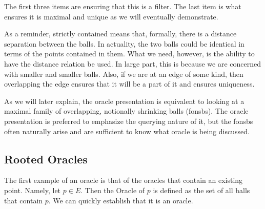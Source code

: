 \documentclass[12pt]{article}
\begin{document}
The first three items are ensuring that this is a filter. The last item is what ensures it is maximal and unique as we will eventually demonstrate. 

As a reminder, strictly contained means that, formally, there is a distance separation between the balls. In actuality, the two balls could be identical in terms of the points contained in them. What we need, however, is the ability to have the distance relation be used. In large part, this is because we are concerned with smaller and smaller balls. Also, if we are at an edge of some kind, then overlapping the edge ensures that it will be a part of it and ensures uniqueness. 

As we will later explain, the oracle presentation is equivalent to looking at a maximal family of overlapping, notionally shrinking balls (fonsbs). The oracle presentation is preferred to emphasize the querying nature of it, but the fonsbs often naturally arise and are sufficient to know what oracle is being discussed. 

\subsection{Rooted Oracles}

The first example of an oracle is that of the oracles that contain an existing point. Namely, let $p \in E$. Then the Oracle of $p$ is defined as the set of all balls that contain $p$. We can quickly establish that it is an oracle.
\end{document}
